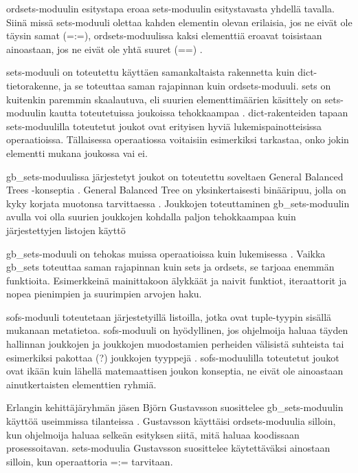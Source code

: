 \documentclass[11pt,oneside,a4paper]{article}
\begin{document}
ordsets-moduulin esitystapa eroaa sets-moduulin esitystavasta yhdellä tavalla.
Siinä missä sets-moduuli olettaa kahden elementin olevan erilaisia, jos ne eivät
ole täysin samat (=:=), ordsets-moduulissa kaksi elementtiä eroavat toisistaan
ainoastaan, jos ne eivät ole yhtä suuret (==) \cite{ERL13}.

sets-moduuli on toteutettu käyttäen samankaltaista rakennetta kuin
dict-tietorakenne, ja se toteuttaa saman rajapinnan kuin ordsets-moduuli.
sets on kuitenkin paremmin skaalautuva, eli suurien elementtimäärien käsittely
on sets-moduulin kautta toteutetuissa joukoissa tehokkaampaa \cite{HEB13}. dict-rakenteiden
tapaan sets-moduulilla toteutetut joukot ovat erityisen hyviä
lukemispainotteisissa operaatioissa. Tällaisessa operaatiossa voitaisiin esimerkiksi
tarkastaa, onko jokin elementti mukana joukossa vai ei.

gb\_sets-moduulissa järjestetyt joukot on toteutettu soveltaen General Balanced
Trees -konseptia \cite{ERL13}. General Balanced Tree on yksinkertaisesti binääripuu, jolla on
kyky korjata muotonsa tarvittaessa \cite{AND13}. Joukkojen toteuttaminen
gb\_sets-moduulin avulla voi olla suurien
joukkojen kohdalla paljon tehokkaampaa kuin järjestettyjen listojen käyttö \cite{ERL13}

gb\_sets-moduuli on tehokas muissa operaatioissa kuin lukemisessa \cite{HEB13}. Vaikka
gb\_sets toteuttaa saman rajapinnan kuin sets ja ordsets, se tarjoaa enemmän
funktioita.
Esimerkkeinä mainittakoon älykkäät ja naivit funktiot, iteraattorit ja nopea
pienimpien ja suurimpien arvojen haku.

sofs-moduuli toteutetaan järjestetyillä listoilla, jotka ovat tuple-tyypin
sisällä mukanaan metatietoa. sofs-moduuli on hyödyllinen, jos ohjelmoija haluaa
täyden hallinnan joukkojen ja joukkojen muodostamien perheiden välisistä
suhteista tai esimerkiksi
pakottaa (?) joukkojen tyyppejä \cite{HEB13}. sofs-moduulilla toteutetut joukot ovat ikään
kuin lähellä matemaattisen joukon konseptia, ne eivät ole ainoastaan
ainutkertaisten elementtien ryhmiä.


Erlangin kehittäjäryhmän jäsen Björn Gustavsson suosittelee gb\_sets-moduulin
käyttöä useimmissa tilanteissa \cite{HEB13}. Gustavsson käyttäisi
ordsets-moduulia silloin,
kun ohjelmoija haluaa selkeän esityksen siitä, mitä haluaa koodissaan
prosessoitavan. sets-moduulia Gustavsson suosittelee käytettäväksi ainostaan
silloin, kun operaattoria =:= tarvitaan. 
\end{document}
